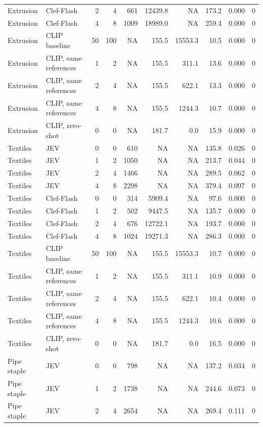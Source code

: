 \begin{table}
\begin{tabular}[t]{llrrrrrrrr}
Extrusion & Clef-Flash & 2 & 4 & 661 & 12439.8 & NA & 173.2 & 0.000 & 0\\
\addlinespace
Extrusion & Clef-Flash & 4 & 8 & 1009 & 18989.0 & NA & 259.4 & 0.000 & 0\\
Extrusion & CLIP baseline & 50 & 100 & NA & 155.5 & 15553.3 & 10.5 & 0.000 & 0\\
Extrusion & CLIP, same references & 1 & 2 & NA & 155.5 & 311.1 & 13.6 & 0.000 & 0\\
Extrusion & CLIP, same references & 2 & 4 & NA & 155.5 & 622.1 & 13.3 & 0.000 & 0\\
Extrusion & CLIP, same references & 4 & 8 & NA & 155.5 & 1244.3 & 10.7 & 0.000 & 0\\
\addlinespace
Extrusion & CLIP, zero-shot & 0 & 0 & NA & 181.7 & 0.0 & 15.9 & 0.000 & 0\\
Textiles & JEV & 0 & 0 & 610 & NA & NA & 135.8 & 0.026 & 0\\
Textiles & JEV & 1 & 2 & 1050 & NA & NA & 213.7 & 0.044 & 0\\
Textiles & JEV & 2 & 4 & 1466 & NA & NA & 289.5 & 0.062 & 0\\
Textiles & JEV & 4 & 8 & 2298 & NA & NA & 379.4 & 0.097 & 0\\
\addlinespace
Textiles & Clef-Flash & 0 & 0 & 314 & 5909.4 & NA & 97.6 & 0.000 & 0\\
Textiles & Clef-Flash & 1 & 2 & 502 & 9447.5 & NA & 135.7 & 0.000 & 0\\
Textiles & Clef-Flash & 2 & 4 & 676 & 12722.1 & NA & 193.7 & 0.000 & 0\\
Textiles & Clef-Flash & 4 & 8 & 1024 & 19271.3 & NA & 286.3 & 0.000 & 0\\
Textiles & CLIP baseline & 50 & 100 & NA & 155.5 & 15553.3 & 10.7 & 0.000 & 0\\
\addlinespace
Textiles & CLIP, same references & 1 & 2 & NA & 155.5 & 311.1 & 10.9 & 0.000 & 0\\
Textiles & CLIP, same references & 2 & 4 & NA & 155.5 & 622.1 & 10.4 & 0.000 & 0\\
Textiles & CLIP, same references & 4 & 8 & NA & 155.5 & 1244.3 & 10.6 & 0.000 & 0\\
Textiles & CLIP, zero-shot & 0 & 0 & NA & 181.7 & 0.0 & 16.5 & 0.000 & 0\\
Pipe staple & JEV & 0 & 0 & 798 & NA & NA & 137.2 & 0.034 & 0\\
\addlinespace
Pipe staple & JEV & 1 & 2 & 1738 & NA & NA & 244.6 & 0.073 & 0\\
Pipe staple & JEV & 2 & 4 & 2654 & NA & NA & 269.4 & 0.111 & 0\\

\end{tabular}
\end{table}
